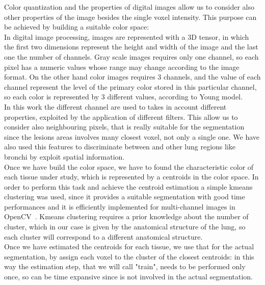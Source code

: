 \documentclass{standalone}
\begin{document}
	Color quantization and the properties of digital images allow us to consider also other properties of the image besides the single voxel intensity.
	This purpose can be achieved by building a suitable color space: \\
	In digital image processing, images are represented with a 3D tensor, in which the first two dimensions represent the height and width of the image 
	and the last one the number of channels. Gray scale images requires only one channel, so each pixel has a numeric values whose range may change 
	according to the image format. On the other hand color images requires 3 channels, and the value of each channel represent the level of the primary 
	color stored in this particular channel, so each color is represented by 3 different values, according to Young model. \\
	In this work the different channel are used to takes in account different properties, exploited by the application of different filters. This allow us to consider also neighbouring pixels, that is really suitable for the segmentation since the  lesions areas involves many closest voxel, not only a single one. We have also used this features to discriminate between and other lung regions like bronchi by exploit spatial information.\\
	
	Once we have build the color space, we have to found the characteristic color of each tissue under study, which is represented by a centroids in the color space. In order to perform this task and achieve the centroid estimation a simple kmeans clustering was used, since it provides a suitable segmentation with good time performances and it is efficiently implemented for multi-channel images in OpenCV~\cite{OpenCV}. 
	Kmeans clustering requires a prior knowledge about the number of cluster, which in our case is given by the anatomical structure of the lung, so each cluster will correspond to a different anatomical structure.\\
	Once we have estimated the centroids for each tissue, we use that for the actual segmentation, by assign each voxel to the cluster of the closest centroids: in this way the estimation step, that we will call "train", needs to be performed only once, so can be time expansive since is not involved in the actual segmentation.\\


	
	
	
	

	
	
\end{document}

